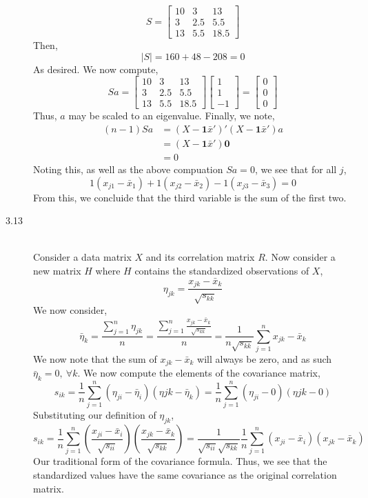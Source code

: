 \documentclass[letterpaper,10pt]{article}
\begin{document}
\begin{description}
\[S=\begin{bmatrix}
10 & 3 & 13\\
3 & 2.5 & 5.5\\
13 & 5.5 & 18.5
\end{bmatrix} \]
Then,
\[|S|=160+48-208=0\]
As desired. We now compute,
\[Sa=\begin{bmatrix}
10 & 3 & 13\\
3 & 2.5 & 5.5\\
13 & 5.5 & 18.5
\end{bmatrix}\begin{bmatrix}
1\\1\\-1
\end{bmatrix}=\begin{bmatrix}
0\\0\\0
\end{bmatrix} \]
Thus, $a$ may be scaled to an eigenvalue. Finally, we note,
\begin{align*}
(n-1)Sa&=(X-\textbf{1}\bar{x}')'(X-\textbf{1}\bar{x}')a\\
&=(X-\textbf{1}\bar{x}')\textbf{0}\\
&=0
\end{align*}
Noting this, as well as the above compuation $Sa=0$, we see that for all $j$,
\[1(x_{j1}-\bar{x}_1)+1(x_{j2}-\bar{x}_2)-1(x_{j3}-\bar{x}_3)=0\]
From this, we concluide that the third variable is the sum of the first two.
\item[3.13]\hfill\\
Consider a data matrix $X$ and its correlation matrix $R$. Now consider a new matrix
$H$ where $H$ contains the standardized observations of $X$,
\[\eta_{jk}=\frac{x_{jk}-\bar{x}_{k}}{\sqrt{s_{kk}}}\]
We now consider, 
\[\bar{\eta}_k=\frac{\sum_{j=1}^n\eta_{jk}}{n}=\frac{\sum_{j=1}^n\frac{x_{jk}-\bar{x}_{k}}{\sqrt{s_{kk}}}}{n}=\frac{1}{n\sqrt{s_{kk}}}\sum_{j=1}^n x_{jk}-\bar{x}_{k}\]
We now note that the sum of $x_{jk}-\bar{x}_k$ will always be zero, and as such $\bar{\eta}_k=0,\ \forall k$. We now compute the elements of the covariance matrix,
\[s_{ik}=\frac{1}{n}\sum_{j=1}^n(\eta_{ji}-\bar{\eta}_i)(\eta{jk}-\bar{\eta}_k)=\frac{1}{n}\sum_{j=1}^n(\eta_{ji}-0)(\eta{jk}-0)\]
Substituting our definition of $\eta_{jk}$,
\[s_{ik}=\frac{1}{n}\sum_{j=1}^n(\frac{x_{ji}-\bar{x}_{i}}{\sqrt{s_{ii}}})(\frac{x_{jk}-\bar{x}_{k}}{\sqrt{s_{kk}}})=\frac{1}{\sqrt{s_{ii}}\sqrt{s_{kk}}}\frac{1}{n}\sum_{j=1}^n(x_{ji}-\bar{x}_i)(x_{jk}-\bar{x}_k)\]
Our traditional form of the covariance formula. Thus, we see that the standardized values have the same covariance as the original correlation matrix.

\end{description}
\end{document}
